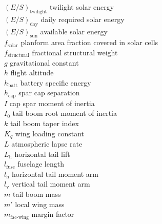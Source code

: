 \begin{multicols}{2}
\begin{tabbing}
$(E/S)_{\text{twilight}}$ \> twilight solar energy \\ %
$(E/S)_{\text{day}}$ \> daily required solar energy \\ %
$(E/S)_{\text{sun}}$ \> available solar energy \\ %
$f_{\text{solar}}$ \> planform area fraction covered in solar cells \\
$f_{\text{structural}}$ \> fractional structural weight\\
$g$ \> gravitational constant \\ %
$h$ \> flight altitude \\ %
$h_{\text{batt}}$ \> battery specific energy \\ %
$h_{\text{cap}}$ \> spar cap separation \\ %
$I$ \> cap spar moment of inertia \\ %
$I_0$ \> tail boom root moment of inertia \\ %
$k$ \> tail boom taper index \\
$K_q$ \> wing loading constant \\ %
$L$ \> atmospheric lapse rate \\ %
$L_\text{h}$ \> horizontal tail lift \\ %
$l_\text{fuse}$ \> fuselage length \\ %
$l_\text{h}$ \> horizontal tail moment arm \\ %
$l_\text{v}$ \> vertical tail moment arm \\ %
$m$ \> tail boom mass \\ %
$m'$ \> local wing mass \\ %
$m_{\text{fac-wing}}$ \> margin factor\\

\end{tabbing}
\end{multicols}
